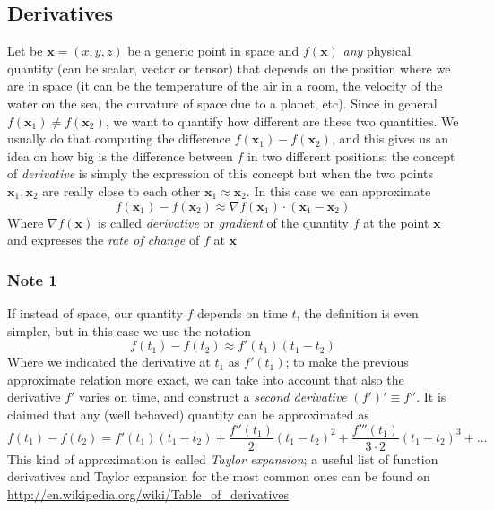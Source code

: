 \documentclass[11pt, a4paper,oneside,openright]{book}
\numberwithin{equation}{section}
\begin{document}
\subsection{Derivatives}
Let be $\mathbf{x}=(x,y,z)$ be a generic point in space and $f(\mathbf{x})$ \textit{any} physical quantity (can be scalar, vector or tensor) that depends on the position where we are in space (it can be the temperature of the air in a room, the velocity of the water on the sea, the curvature of space due to a planet, etc). Since in general $f(\mathbf{x}_1)\neq f(\mathbf{x}_2)$, we want to quantify how different are these two quantities. We usually do that computing the difference $f(\mathbf{x}_1)-f(\mathbf{x}_2)$, and this gives us an idea on how big is the difference between $f$ in two different positions; the concept of \textit{derivative} is simply the expression of this concept but when the two points $\mathbf{x}_1,\mathbf{x}_2$ are really close to each other $\mathbf{x}_1\approx\mathbf{x}_2$. In this case we can approximate 
\begin{equation}
f(\mathbf{x}_1)-f(\mathbf{x}_2)\approx \nabla f(\mathbf{x}_1)\cdot(\mathbf{x}_1-\mathbf{x}_2)
\end{equation}
Where $\nabla f(\mathbf{x})$ is called \textit{derivative} or \textit{gradient} of the quantity $f$ at the point $\mathbf{x}$ and expresses the \textit{rate of change} of $f$ at $\mathbf{x}$
\subsubsection{Note 1}
If instead of space, our quantity $f$ depends on time $t$, the definition is even simpler, but in this case we use the notation
\begin{equation}
f(t_1)-f(t_2)\approx f'(t_1)(t_1-t_2)
\end{equation}
Where we indicated the derivative at $t_1$ as $f'(t_1)$; to make the previous approximate relation more exact, we can take into account that also the derivative $f'$ varies on time, and construct a \textit{second derivative} $(f')'\equiv f''$. It is claimed that any (well behaved) quantity can be approximated as 
\begin{equation}
f(t_1)-f(t_2)=f'(t_1)(t_1-t_2)+\frac{f''(t_1)}{2}(t_1-t_2)^2+\frac{f'''(t_1)}{3\cdot 2}(t_1-t_2)^3+...
\end{equation}
This kind of approximation is called \textit{Taylor expansion}; a useful list of function derivatives and Taylor expansion for the most common ones can be found on \url{http://en.wikipedia.org/wiki/Table_of_derivatives}
\end{document}
